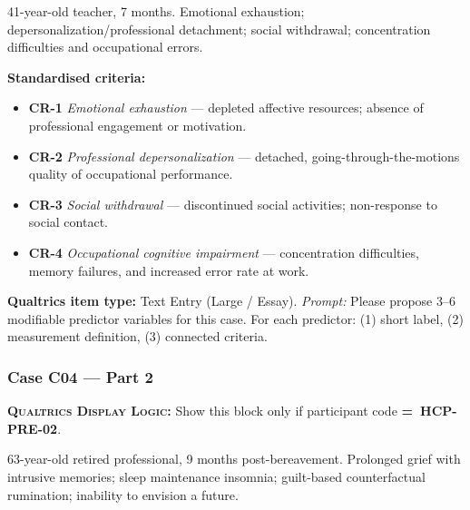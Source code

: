\documentclass[11pt,a4paper]{article}
\newcommand{\responsetextarea}[1]{\begin{tcolorbox}[colback=ResponseBG,colframe=GoldAmber,boxrule=0.6pt,arc=1.5mm,left=6pt,right=6pt,top=5pt,bottom=5pt]\small\textbf{\color{GoldAmber}Qualtrics item type:} Text Entry (Large / Essay). \quad \textit{Prompt:} #1\end{tcolorbox}}
\newcommand{\dlnote}[1]{\par\vspace{0.15em}\noindent\begin{tcolorbox}[colback=AccentAmber,colframe=GoldAmber,boxrule=0.45pt,arc=1mm,left=5pt,right=5pt,top=2.5pt,bottom=2.5pt]\footnotesize\textbf{\color{GoldAmber}\scshape Qualtrics Display Logic:} Show this block only if participant code \textbf{=~#1}.\end{tcolorbox}\vspace{0.1em}}
\begin{document}
\begin{complaintbox}[title=Case C03 --- Complaint (abbreviated)]
\small 41-year-old teacher, 7 months. Emotional exhaustion; depersonalization/professional detachment; social withdrawal; concentration difficulties and occupational errors.
\end{complaintbox}

\begin{contextbox}
\small\textbf{Standardised criteria:}
\begin{itemize}[topsep=2pt,itemsep=1pt]
\item \textbf{CR-1} \textit{Emotional exhaustion} --- depleted affective resources; absence of professional engagement or motivation.
\item \textbf{CR-2} \textit{Professional depersonalization} --- detached, going-through-the-motions quality of occupational performance.
\item \textbf{CR-3} \textit{Social withdrawal} --- discontinued social activities; non-response to social contact.
\item \textbf{CR-4} \textit{Occupational cognitive impairment} --- concentration difficulties, memory failures, and increased error rate at work.
\end{itemize}
\end{contextbox}

\responsetextarea{Please propose 3--6 modifiable predictor variables for this case. For each predictor: (1) short label, (2) measurement definition, (3) connected criteria.}

\vspace{0.4em}

\subsubsection*{Case C04 --- Part 2}
\dlnote{HCP-PRE-02}

\begin{complaintbox}[title=Case C04 --- Complaint (abbreviated)]
\small 63-year-old retired professional, 9 months post-bereavement. Prolonged grief with intrusive memories; sleep maintenance insomnia; guilt-based counterfactual rumination; inability to envision a future.
\end{complaintbox}
\end{document}
